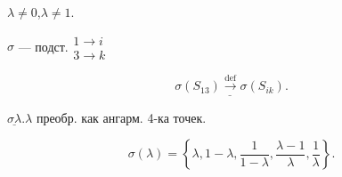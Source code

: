 $\lambda\ne0$,\quad $\lambda\ne1$.

$\sigma$ --- подст.\qquad $\begin{gathered}1\longrightarrow i\\3\longrightarrow k\end{gathered}$

\begin{equation*}\underline{\sigma(S_{13})\overset{\mathrm{def}}{\longrightarrow}\sigma(S_{ik})}.\end{equation*}

$\underline{\sigma\lambda}$.\qquad $\lambda$ преобр. как ангарм. 4-ка точек.

\begin{equation*}\sigma(\lambda)=\left\{\lambda,1-\lambda,\frac1{1-\lambda},\frac{\lambda-1}{\lambda},\frac1\lambda\right\}.\end{equation*}





